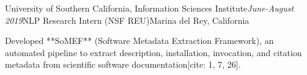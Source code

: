 \begin{rSubsection}{University of Southern California, Information Sciences Institute}{\em June-August 2019}{NLP Research Intern (NSF REU)}{Marina del Rey, California} 
\item Developed **SoMEF** (Software Metadata Extraction Framework), an automated pipeline to extract description, installation, invocation, and citation metadata from scientific software documentation[cite: 1, 7, 26].

\end{rSubsection}
